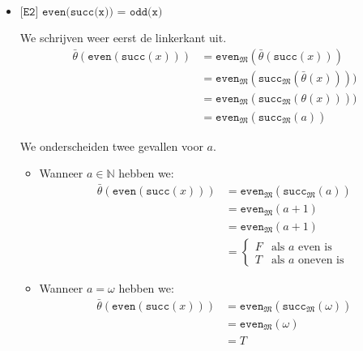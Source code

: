 \documentclass[a4paper,11pt]{article}
\begin{document}
\begin{itemize}
\item{$\texttt{[E2] even(succ(x)) = odd(x)}$}

We schrijven weer eerst de linkerkant uit.
\begin{align*}
\bar \theta(\texttt{even}(\texttt{succ}(x))) &= \texttt{even}_{\mathfrak{M}}(\bar \theta(\texttt{succ}(x))) \\
                                             &= \texttt{even}_{\mathfrak{M}}(\texttt{succ}_{\mathfrak{M}}(\bar \theta(x)))) \\
                                             &= \texttt{even}_{\mathfrak{M}}(\texttt{succ}_{\mathfrak{M}}(\theta(x)))) \\
                                             &= \texttt{even}_{\mathfrak{M}}(\texttt{succ}_{\mathfrak{M}}(a))
\end{align*}

We onderscheiden twee gevallen voor $a$.

\begin{itemize}

\item
Wanneer $a \in \mathbb{N}$ hebben we:
\begin{align*}
\bar \theta(\texttt{even}(\texttt{succ}(x))) &= \texttt{even}_{\mathfrak{M}}(\texttt{succ}_{\mathfrak{M}}(a)) \\
                                             &= \texttt{even}_{\mathfrak{M}}(a+1) \\
                                             &= \texttt{even}_{\mathfrak{M}}(a+1) \\
                                             &= \begin{cases}
  F & \text{als $a$ even is} \\
  T & \text{als $a$ oneven is}
\end{cases}
\end{align*}

\item
Wanneer $a = \omega$ hebben we:
\begin{align*}
\bar \theta(\texttt{even}(\texttt{succ}(x))) &= \texttt{even}_{\mathfrak{M}}(\texttt{succ}_{\mathfrak{M}}(\omega)) \\
                                             &= \texttt{even}_{\mathfrak{M}}(\omega) \\
                                             &= T
\end{align*}

\end{itemize}


\end{itemize}
\end{document}
